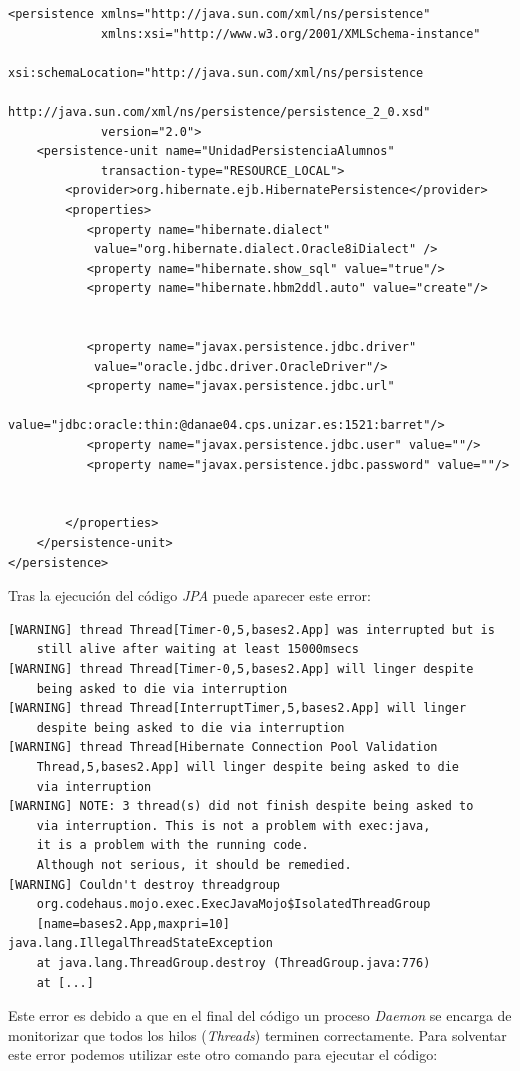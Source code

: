 \documentclass[11pt,a4paper]{article}
\begin{document}
\begin{lstlisting}
<persistence xmlns="http://java.sun.com/xml/ns/persistence"
             xmlns:xsi="http://www.w3.org/2001/XMLSchema-instance"
             xsi:schemaLocation="http://java.sun.com/xml/ns/persistence 
             http://java.sun.com/xml/ns/persistence/persistence_2_0.xsd" 
             version="2.0">
	<persistence-unit name="UnidadPersistenciaAlumnos"
			 transaction-type="RESOURCE_LOCAL">
		<provider>org.hibernate.ejb.HibernatePersistence</provider>
		<properties>
		   <property name="hibernate.dialect" 
		   	value="org.hibernate.dialect.Oracle8iDialect" />
		   <property name="hibernate.show_sql" value="true"/>		
		   <property name="hibernate.hbm2ddl.auto" value="create"/>
		  
		   
		   <property name="javax.persistence.jdbc.driver" 
		   	value="oracle.jdbc.driver.OracleDriver"/>
		   <property name="javax.persistence.jdbc.url" 
		   	value="jdbc:oracle:thin:@danae04.cps.unizar.es:1521:barret"/>
		   <property name="javax.persistence.jdbc.user" value=""/>
		   <property name="javax.persistence.jdbc.password" value=""/>		   
		   

		</properties>
	</persistence-unit>
</persistence>
\end{lstlisting}

Tras la ejecución del código \emph{JPA} puede aparecer este error:

\begin{lstlisting}
[WARNING] thread Thread[Timer-0,5,bases2.App] was interrupted but is 
	still alive after waiting at least 15000msecs
[WARNING] thread Thread[Timer-0,5,bases2.App] will linger despite 
	being asked to die via interruption
[WARNING] thread Thread[InterruptTimer,5,bases2.App] will linger 
	despite being asked to die via interruption
[WARNING] thread Thread[Hibernate Connection Pool Validation 
	Thread,5,bases2.App] will linger despite being asked to die 
	via interruption
[WARNING] NOTE: 3 thread(s) did not finish despite being asked to 
	via interruption. This is not a problem with exec:java, 
	it is a problem with the running code. 
	Although not serious, it should be remedied.
[WARNING] Couldn't destroy threadgroup 
	org.codehaus.mojo.exec.ExecJavaMojo$IsolatedThreadGroup
	[name=bases2.App,maxpri=10]
java.lang.IllegalThreadStateException
    at java.lang.ThreadGroup.destroy (ThreadGroup.java:776)
    at [...]
\end{lstlisting}

Este error es debido a que en el final del código un proceso \emph{Daemon} se encarga de monitorizar que todos los hilos (\emph{Threads}) terminen correctamente. Para solventar este error podemos utilizar este otro comando para ejecutar el código:
\end{document}
